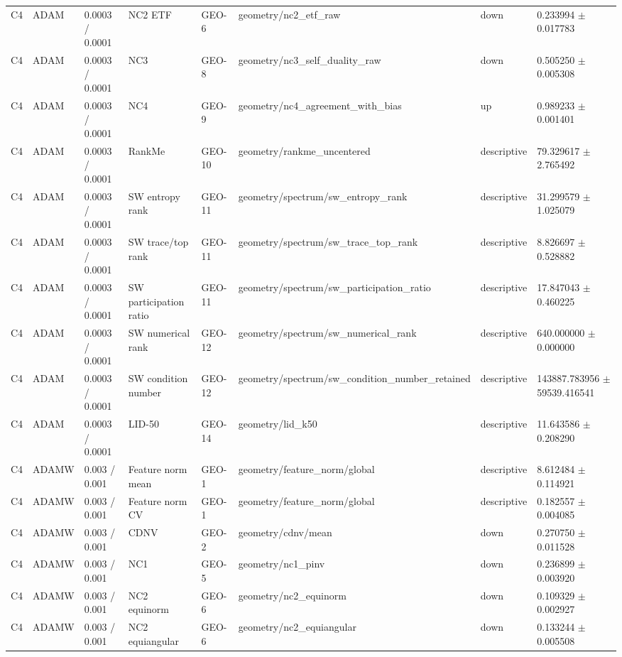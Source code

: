 \begin{longtable}{llllllll}
C4 & ADAM & 0.0003 / 0.0001 & NC2 ETF & GEO-6 & geometry/nc2\_etf\_raw & down & 0.233994 $\pm$ 0.017783 \\
C4 & ADAM & 0.0003 / 0.0001 & NC3 & GEO-8 & geometry/nc3\_self\_duality\_raw & down & 0.505250 $\pm$ 0.005308 \\
C4 & ADAM & 0.0003 / 0.0001 & NC4 & GEO-9 & geometry/nc4\_agreement\_with\_bias & up & 0.989233 $\pm$ 0.001401 \\
C4 & ADAM & 0.0003 / 0.0001 & RankMe & GEO-10 & geometry/rankme\_uncentered & descriptive & 79.329617 $\pm$ 2.765492 \\
C4 & ADAM & 0.0003 / 0.0001 & SW entropy rank & GEO-11 & geometry/spectrum/sw\_entropy\_rank & descriptive & 31.299579 $\pm$ 1.025079 \\
C4 & ADAM & 0.0003 / 0.0001 & SW trace/top rank & GEO-11 & geometry/spectrum/sw\_trace\_top\_rank & descriptive & 8.826697 $\pm$ 0.528882 \\
C4 & ADAM & 0.0003 / 0.0001 & SW participation ratio & GEO-11 & geometry/spectrum/sw\_participation\_ratio & descriptive & 17.847043 $\pm$ 0.460225 \\
C4 & ADAM & 0.0003 / 0.0001 & SW numerical rank & GEO-12 & geometry/spectrum/sw\_numerical\_rank & descriptive & 640.000000 $\pm$ 0.000000 \\
C4 & ADAM & 0.0003 / 0.0001 & SW condition number & GEO-12 & geometry/spectrum/sw\_condition\_number\_retained & descriptive & 143887.783956 $\pm$ 59539.416541 \\
C4 & ADAM & 0.0003 / 0.0001 & LID-50 & GEO-14 & geometry/lid\_k50 & descriptive & 11.643586 $\pm$ 0.208290 \\
C4 & ADAMW & 0.003 / 0.001 & Feature norm mean & GEO-1 & geometry/feature\_norm/global & descriptive & 8.612484 $\pm$ 0.114921 \\
C4 & ADAMW & 0.003 / 0.001 & Feature norm CV & GEO-1 & geometry/feature\_norm/global & descriptive & 0.182557 $\pm$ 0.004085 \\
C4 & ADAMW & 0.003 / 0.001 & CDNV & GEO-2 & geometry/cdnv/mean & down & 0.270750 $\pm$ 0.011528 \\
C4 & ADAMW & 0.003 / 0.001 & NC1 & GEO-5 & geometry/nc1\_pinv & down & 0.236899 $\pm$ 0.003920 \\
C4 & ADAMW & 0.003 / 0.001 & NC2 equinorm & GEO-6 & geometry/nc2\_equinorm & down & 0.109329 $\pm$ 0.002927 \\
C4 & ADAMW & 0.003 / 0.001 & NC2 equiangular & GEO-6 & geometry/nc2\_equiangular & down & 0.133244 $\pm$ 0.005508 \\

\end{longtable}
